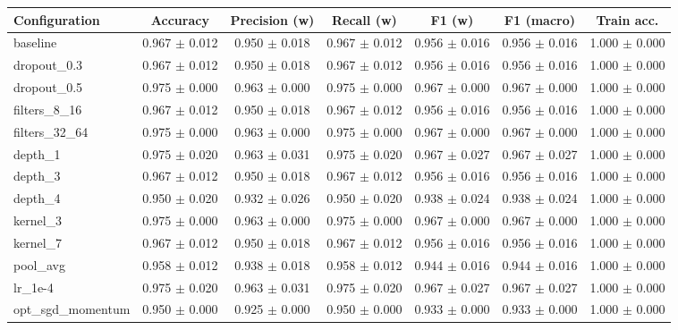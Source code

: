 \begin{tabular}{lcccccc}
\hline
Configuration & Accuracy & Precision (w) & Recall (w) & F1 (w) & F1 (macro) & Train acc. \\
\hline
baseline & 0.967 $\pm$ 0.012 & 0.950 $\pm$ 0.018 & 0.967 $\pm$ 0.012 & 0.956 $\pm$ 0.016 & 0.956 $\pm$ 0.016 & 1.000 $\pm$ 0.000 \\
dropout\_0.3 & 0.967 $\pm$ 0.012 & 0.950 $\pm$ 0.018 & 0.967 $\pm$ 0.012 & 0.956 $\pm$ 0.016 & 0.956 $\pm$ 0.016 & 1.000 $\pm$ 0.000 \\
dropout\_0.5 & 0.975 $\pm$ 0.000 & 0.963 $\pm$ 0.000 & 0.975 $\pm$ 0.000 & 0.967 $\pm$ 0.000 & 0.967 $\pm$ 0.000 & 1.000 $\pm$ 0.000 \\
filters\_8\_16 & 0.967 $\pm$ 0.012 & 0.950 $\pm$ 0.018 & 0.967 $\pm$ 0.012 & 0.956 $\pm$ 0.016 & 0.956 $\pm$ 0.016 & 1.000 $\pm$ 0.000 \\
filters\_32\_64 & 0.975 $\pm$ 0.000 & 0.963 $\pm$ 0.000 & 0.975 $\pm$ 0.000 & 0.967 $\pm$ 0.000 & 0.967 $\pm$ 0.000 & 1.000 $\pm$ 0.000 \\
depth\_1 & 0.975 $\pm$ 0.020 & 0.963 $\pm$ 0.031 & 0.975 $\pm$ 0.020 & 0.967 $\pm$ 0.027 & 0.967 $\pm$ 0.027 & 1.000 $\pm$ 0.000 \\
depth\_3 & 0.967 $\pm$ 0.012 & 0.950 $\pm$ 0.018 & 0.967 $\pm$ 0.012 & 0.956 $\pm$ 0.016 & 0.956 $\pm$ 0.016 & 1.000 $\pm$ 0.000 \\
depth\_4 & 0.950 $\pm$ 0.020 & 0.932 $\pm$ 0.026 & 0.950 $\pm$ 0.020 & 0.938 $\pm$ 0.024 & 0.938 $\pm$ 0.024 & 1.000 $\pm$ 0.000 \\
kernel\_3 & 0.975 $\pm$ 0.000 & 0.963 $\pm$ 0.000 & 0.975 $\pm$ 0.000 & 0.967 $\pm$ 0.000 & 0.967 $\pm$ 0.000 & 1.000 $\pm$ 0.000 \\
kernel\_7 & 0.967 $\pm$ 0.012 & 0.950 $\pm$ 0.018 & 0.967 $\pm$ 0.012 & 0.956 $\pm$ 0.016 & 0.956 $\pm$ 0.016 & 1.000 $\pm$ 0.000 \\
pool\_avg & 0.958 $\pm$ 0.012 & 0.938 $\pm$ 0.018 & 0.958 $\pm$ 0.012 & 0.944 $\pm$ 0.016 & 0.944 $\pm$ 0.016 & 1.000 $\pm$ 0.000 \\
lr\_1e-4 & 0.975 $\pm$ 0.020 & 0.963 $\pm$ 0.031 & 0.975 $\pm$ 0.020 & 0.967 $\pm$ 0.027 & 0.967 $\pm$ 0.027 & 1.000 $\pm$ 0.000 \\
opt\_sgd\_momentum & 0.950 $\pm$ 0.000 & 0.925 $\pm$ 0.000 & 0.950 $\pm$ 0.000 & 0.933 $\pm$ 0.000 & 0.933 $\pm$ 0.000 & 1.000 $\pm$ 0.000 \\
\hline
\end{tabular}
